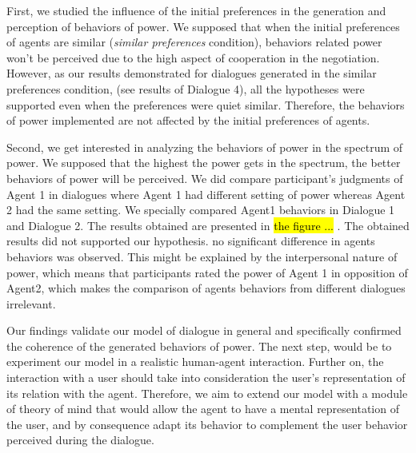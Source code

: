 \documentclass{llncs}
\begin{document}
	First, we studied the influence of the initial preferences in the generation and perception of behaviors of power.
	We supposed that when the initial preferences of agents are similar (\textit{similar preferences} condition), behaviors related power won't be perceived due to the high aspect of cooperation in the negotiation. However, as our results demonstrated for dialogues generated in the similar preferences condition, (see results of Dialogue 4), all the hypotheses were supported even when the preferences were quiet similar. Therefore, the behaviors of power implemented are not affected by the initial preferences of agents.
	
	Second, we get interested in analyzing the behaviors of power in the spectrum of power. We supposed that the highest the power gets in the spectrum, the better behaviors of power will be perceived. We did compare participant's judgments of Agent 1 in dialogues where Agent 1 had different setting of power whereas Agent 2 had the same setting. We specially compared Agent1 behaviors in Dialogue 1 and Dialogue 2. The results obtained are presented in \hl{the figure ... }.	
	The obtained results did not supported our hypothesis. no significant difference in agents behaviors was observed. This might be explained by the interpersonal nature of power, which means that participants rated the power of Agent 1 in opposition of Agent2, which makes the comparison of agents behaviors from different dialogues irrelevant. 
	
	Our findings validate our model of dialogue in general and specifically confirmed the coherence of the generated behaviors of power. 
	The next step, would be to experiment our model in a realistic human-agent interaction.
	Further on, the interaction with a user should take into consideration the user's representation of its relation with the agent. Therefore, we aim to extend our model with a module of theory of mind that would allow the agent to have a mental representation of the user, and by consequence adapt its behavior to complement the user behavior perceived during the dialogue.
	
	
		

	
	\vskip 4pt
	
	\small{}



	
\end{document}
